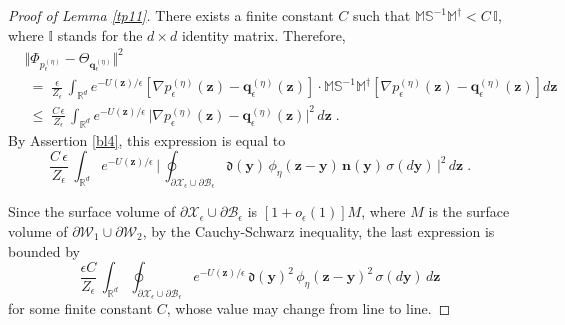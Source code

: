 \documentclass[reqno]{amsart}
\newcounter{as}[section]
\newcommand{\mc}[1]{{\mathcal #1}}
\newcommand{\mf}[1]{{\mathfrak #1}}
\newcommand{\bb}[1]{{\mathbb #1}}
\newcommand{\bs}[1]{{\boldsymbol #1}}
\newcommand{\<}{\langle}
\renewcommand{\>}{\rangle}
\begin{document}
\begin{proof}[Proof of Lemma \ref{tp11}]
There exists a finite constant $C$ such that $\bb{M} \bb{S}^{-1}
\bb{M}^{\dagger} < C \, \bb{I}$, where $\bb{I}$ stands for the $d\times d$
identity matrix. Therefore,
\begin{align*}
& \big\Vert \Phi_{p_{\epsilon}^{(\eta)}} -
\Theta_{\bs{q}_{\epsilon}^{(\eta)}} \big\Vert ^{2} \\
&  \;=\;\frac{\epsilon}{Z_{\epsilon}}\, \int_{\bb{R}^{d}}
e^{-U(\bs{z})/\epsilon} \left[\nabla p_{\epsilon}^{(\eta)}(\bs{z}) -
  \bs{q}_{\epsilon}^{(\eta)} (\bs{z})\right] \cdot
\bb{M}\bb{S}^{-1}\bb{M}^{\dagger}
\left[\nabla p_{\epsilon}^{(\eta)}(\bs{z}) -
\bs{q}_{\epsilon}^{(\eta)}(\bs{z})\right]d\bs{z}\\
&  \;\le\; \frac{C\, \epsilon}{Z_{\epsilon}}\,
\int_{\bb{R}^{d}} e^{-U(\bs{z})/\epsilon} \, \big|\nabla
p_{\epsilon}^{(\eta)}(\bs{z})
-\bs{q}_{\epsilon}^{(\eta)}(\bs{z})\big|^{2} \, d\bs{z}\;.
\end{align*}
By Assertion \ref{bl4}, this expression is equal to
\begin{equation*}
\frac{C\, \epsilon}{Z_{\epsilon}}\,
\int_{\bb{R}^{d}} e^{-U(\bs{z})/\epsilon}\,
\Big |\, \oint_{\partial\mc{X}_{\epsilon}\cup\partial\mc{B}_{\epsilon}}
\mf{d}(\bs{y}) \, \phi_{\eta}(\bs{z}-\bs{y})\, \bs{n}(\bs{y})
\, \sigma(d\bs{y}) \, \Big|^{2} \, d\bs{z}\;.
\end{equation*}

Since the surface volume of $\partial\mc{X}_{\epsilon}
\cup \partial\mc{B}_{\epsilon}$ is $[1+o_{\epsilon}(1)]M$,
where $M$ is the surface volume of $\partial\mc{W}_{1}
\cup \partial\mc{W}_{2}$, by the Cauchy-Schwarz inequality, the last
expression is bounded by
\begin{equation*}
\frac{\epsilon C}{Z_{\epsilon}}\,
\int_{\bb{R}^{d}}
\oint_{\partial\mc{X}_{\epsilon}\cup\partial\mc{B}_{\epsilon}}
e^{-U(\bs{z})/\epsilon}\, \mf{d}(\bs{y})^2 \,
\phi_{\eta}(\bs{z}-\bs{y})^{2} \, \sigma(d\bs{y})\, d\bs{z}
\end{equation*}
for some finite constant $C$, whose value may change from line to
line.


\end{proof}
\end{document}
